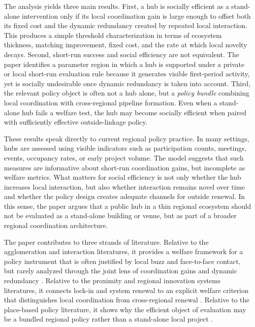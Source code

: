 The analysis yields three main results. First, a hub is socially efficient as a stand-alone intervention only if its local coordination gain is large enough to offset both its fixed cost and the dynamic redundancy created by repeated local interaction. This produces a simple threshold characterization in terms of ecosystem thickness, matching improvement, fixed cost, and the rate at which local novelty decays. Second, short-run success and social efficiency are not equivalent. The paper identifies a parameter region in which a hub is supported under a private or local short-run evaluation rule because it generates visible first-period activity, yet is socially undesirable once dynamic redundancy is taken into account. Third, the relevant policy object is often not a hub alone, but a \emph{policy bundle} combining local coordination with cross-regional pipeline formation. Even when a stand-alone hub fails a welfare test, the hub may become socially efficient when paired with sufficiently effective outside-linkage policy.

These results speak directly to current regional policy practice. In many settings, hubs are assessed using visible indicators such as participation counts, meetings, events, occupancy rates, or early project volume. The model suggests that such measures are informative about short-run coordination gains, but incomplete as welfare metrics. What matters for social efficiency is not only whether the hub increases local interaction, but also whether interaction remains novel over time and whether the policy design creates adequate channels for outside renewal. In this sense, the paper argues that a public hub in a thin regional ecosystem should not be evaluated as a stand-alone building or venue, but as part of a broader regional coordination architecture.

The paper contributes to three strands of literature. Relative to the agglomeration and interaction literatures, it provides a welfare framework for a policy instrument that is often justified by local buzz and face-to-face contact, but rarely analyzed through the joint lens of coordination gains and dynamic redundancy \citep{DurantonPuga2004,StorperVenables2004,BatheltMalmbergMaskell2004}. Relative to the proximity and regional innovation systems literatures, it connects lock-in and system renewal to an explicit welfare criterion that distinguishes local coordination from cross-regional renewal \citep{Boschma2005,AsheimLawtonSmithOughton2011}. Relative to the place-based policy literature, it shows why the efficient object of evaluation may be a bundled regional policy rather than a stand-alone local project \citep{KlineMoretti2014ARE,NeumarkSimpson2015}.

